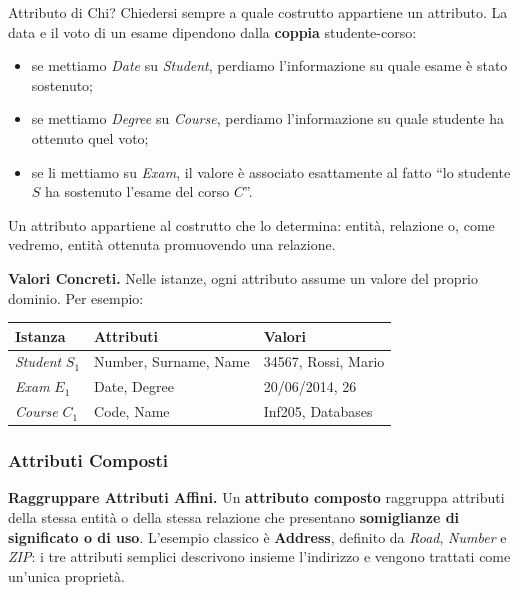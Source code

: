 \documentclass[12pt]{extarticle}
\begin{document}
\begin{cbox}{Attributo di Chi?}
\noindent Chiedersi sempre a quale costrutto appartiene un attributo. La data e il voto di un esame dipendono dalla \textbf{coppia} studente-corso:
\begin{itemize}
    \item se mettiamo \textit{Date} su \textit{Student}, perdiamo l'informazione su quale esame è stato sostenuto;
    \item se mettiamo \textit{Degree} su \textit{Course}, perdiamo l'informazione su quale studente ha ottenuto quel voto;
    \item se li mettiamo su \textit{Exam}, il valore è associato esattamente al fatto ``lo studente $S$ ha sostenuto l'esame del corso $C$''.
\end{itemize}
Un attributo appartiene al costrutto che lo determina: entità, relazione o, come vedremo, entità ottenuta promuovendo una relazione.
\end{cbox}

\medskip
\noindent \textbf{Valori Concreti.} Nelle istanze, ogni attributo assume un valore del proprio dominio. Per esempio:
\begin{center}
\small
\begin{tabular}{@{}lll@{}}
    \toprule
    \textbf{Istanza} & \textbf{Attributi} & \textbf{Valori} \\
    \midrule
    \textit{Student} $S_1$ & Number, Surname, Name & 34567, Rossi, Mario \\
    \textit{Exam} $E_1$ & Date, Degree & 20/06/2014, 26 \\
    \textit{Course} $C_1$ & Code, Name & Inf205, Databases \\
    \bottomrule
\end{tabular}
\end{center}

\subsubsection{Attributi Composti}

\noindent \textbf{Raggruppare Attributi Affini.} Un \textbf{attributo composto} raggruppa attributi della stessa entità o della stessa relazione che presentano \textbf{somiglianze di significato o di uso}. L'esempio classico è \textbf{Address}, definito da \textit{Road}, \textit{Number} e \textit{ZIP}: i tre attributi semplici descrivono insieme l'indirizzo e vengono trattati come un'unica proprietà.
\end{document}
